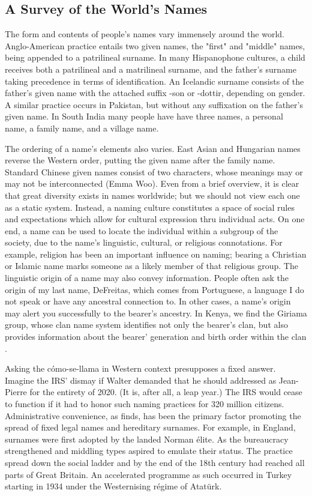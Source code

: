 \subsection{A Survey of the World's Names}

The form and contents of people's names vary immensely around the world.
Anglo-American practice entails two given names, the "first" and "middle" names,
being appended to a patrilineal surname. In many Hispanophone cultures, a child
receives both a patrilineal and a matrilineal surname, and the father's surname
taking precedence in terms of identification. An Icelandic surname consists of
the father's given name with the attached suffix -son or -dottir, depending on
gender. A similar practice occurs in Pakistan, but without any suffixation on
the father's given name. In South India many people have have three names, a
personal name, a family name, and a village name.

The ordering of a name's elements also varies. East Asian and Hungarian names
reverse the Western order, putting the given name after the family name.
Standard Chinese given names consist of two characters, whose meanings may or
may not be interconnected (Emma Woo). 
Even from a brief overview, it is clear that great diversity exists in names
worldwide; but we should not view each one as a static system. Instead, a naming
culture constitutes a space of social rules and expectations which allow for
cultural expression thru individual acts. On one end, a name can be used to
locate the individual within a subgroup of the society, due to the name's
linguistic, cultural, or religious connotations. For example, religion has been
an important influence on naming; bearing a Christian or Islamic name marks
someone as a likely member of that religious group. The linguistic origin of a
name may also convey information. People often ask the origin of my last name,
DeFreitas, which comes from Portuguese, a language I do not speak or have any
ancestral connection to. In other cases, a name's origin may alert you
successfully to the bearer's ancestry. In Kenya, we find the Giriama group,
whose clan name system identifies not only the bearer's clan, but also provides
information about the bearer' generation and birth order within the clan
\textcite{parkin89}.

Asking the cómo-se-llama in Western context presupposes a fixed answer. Imagine
the IRS' dismay if Walter demanded that he should addressed as Jean-Pierre for
the entirety of 2020. (It is, after all, a leap year.) The IRS would cease to
function if it had to honor such naming practices for 320 million citizens.
Administrative convenience, as \textcite{scott02} finds, has been the primary
factor promoting the spread of fixed legal names and hereditary surnames. For
example, in England, surnames were first adopted by the landed Norman élite. As
the bureaucracy strengthened and middling types aspired to emulate their status.
The practice spread down the social ladder and by the end of the 18th century
had reached all parts of Great Britain. An accelerated programme as such
occurred in Turkey starting in 1934 under the Westernising régime of Atatürk.
